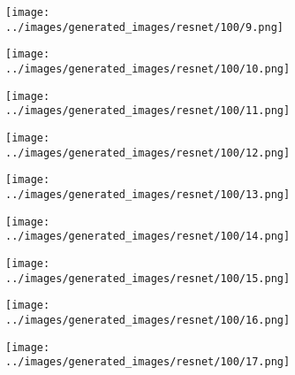 \begin{figure}[H]
\begin{subfigure}[b]{0.1\textwidth}
 \end{subfigure}
 \hspace{1em}%
 \begin{subfigure}[b]{0.1\textwidth}
   \centering
   \texttt{[image: ../images/generated\_images/resnet/100/9.png]}
 \end{subfigure}
 \hspace{1em}%
 \begin{subfigure}[b]{0.1\textwidth}
   \centering
   \texttt{[image: ../images/generated\_images/resnet/100/10.png]}
 \end{subfigure}
 \hspace{1em}%
 \begin{subfigure}[b]{0.1\textwidth}
   \centering
   \texttt{[image: ../images/generated\_images/resnet/100/11.png]}
 \end{subfigure}
 \hspace{1em}%
 \begin{subfigure}[b]{0.1\textwidth}
 \centering
 \texttt{[image: ../images/generated\_images/resnet/100/12.png]}
 \end{subfigure}
 \hspace{1em}%
 \begin{subfigure}[b]{0.1\textwidth}
   \centering
   \texttt{[image: ../images/generated\_images/resnet/100/13.png]}
 \end{subfigure}
 \hspace{1em}%
 \begin{subfigure}[b]{0.1\textwidth}
   \centering
   \texttt{[image: ../images/generated\_images/resnet/100/14.png]}
 \end{subfigure}
 \hspace{1em}%
 \begin{subfigure}[b]{0.1\textwidth}
   \centering
   \texttt{[image: ../images/generated\_images/resnet/100/15.png]}
 \end{subfigure}
 \hspace{1em}%
 \begin{subfigure}[b]{0.1\textwidth}
 \centering
 \texttt{[image: ../images/generated\_images/resnet/100/16.png]}
 \end{subfigure}
 \hspace{1em}%
 \begin{subfigure}[b]{0.1\textwidth}
 \centering
 \texttt{[image: ../images/generated\_images/resnet/100/17.png]}
\end{subfigure}

\end{figure}
